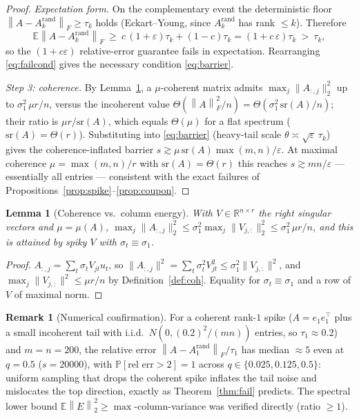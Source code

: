 \documentclass{amsart}
\newtheorem{lemma}{Lemma}
\theoremstyle{definition}
\newtheorem{remark}{Remark}
\newcommand{\R}{\mathbb{R}}
\newcommand{\Frob}[1]{\left\lVert #1\right\rVert_F}
\newcommand{\Op}[1]{\left\lVert #1\right\rVert_2}
\newcommand{\E}{\mathbb{E}}
\newcommand{\Prob}{\mathbb{P}}
\begin{document}
\begin{proof}
\emph{Expectation form.} On the complementary event the deterministic floor
$\Frob{A-A_k^{\mathrm{rand}}}\ge\tau_k$ holds (Eckart--Young, since
$A_k^{\mathrm{rand}}$ has rank $\le k$). Therefore
\[
\E\Frob{A-A_k^{\mathrm{rand}}}\ \ge\ c\,(1+\varepsilon)\tau_k+(1-c)\tau_k
=(1+c\,\varepsilon)\tau_k\ >\ \tau_k,
\]
so the $(1+c\varepsilon)$ relative-error guarantee fails in expectation.
Rearranging \eqref{eq:failcond} gives the necessary condition \eqref{eq:barrier}.

\emph{Step 3: coherence.} By Lemma~\ref{lem:colenergy}, a $\mu$-coherent matrix
admits $\max_j\|A_{:,j}\|_2^2$ up to $\sigma_1^2\,\mu r/n$, versus the incoherent
value $\Theta(\Frob A^2/n)=\Theta(\sigma_1^2\,\mathrm{sr}(A)/n)$; their ratio is
$\mu r/\mathrm{sr}(A)$, which equals $\Theta(\mu)$ for a flat spectrum
($\mathrm{sr}(A)=\Theta(r)$). Substituting into \eqref{eq:barrier} (heavy-tail
scale $\theta\asymp\sqrt\varepsilon\,\tau_k$) gives the coherence-inflated
barrier $s\gtrsim\mu\,\mathrm{sr}(A)\max(m,n)/\varepsilon$. At maximal coherence
$\mu=\max(m,n)/r$ with $\mathrm{sr}(A)=\Theta(r)$ this reaches
$s\gtrsim mn/\varepsilon$ --- essentially all entries --- consistent with the
exact failures of Propositions~\ref{prop:spike}--\ref{prop:coupon}.
\end{proof}

\begin{lemma}[Coherence vs.\ column energy]\label{lem:colenergy}
With $V\in\R^{n\times r}$ the right singular vectors and $\mu=\mu(A)$,
$\max_j\|A_{:,j}\|_2^2\le\sigma_1^2\max_j\|V_{j,:}\|_2^2\le\sigma_1^2\,\mu r/n$,
and this is attained by spiky $V$ with $\sigma_t\equiv\sigma_1$.
\end{lemma}

\begin{proof}
$A_{:,j}=\sum_t\sigma_t V_{jt}u_t$, so $\|A_{:,j}\|^2=\sum_t\sigma_t^2V_{jt}^2
\le\sigma_1^2\|V_{j,:}\|^2$, and $\max_j\|V_{j,:}\|^2\le\mu r/n$ by
Definition~\ref{def:coh}. Equality for $\sigma_t\equiv\sigma_1$ and a row of $V$
of maximal norm.
\end{proof}

\begin{remark}[Numerical confirmation]\label{rem:numfail}
For a coherent rank-$1$ spike ($A=e_1e_1^\top$ plus a small incoherent tail
with i.i.d.\ $N(0,(0.2)^2/(mn))$ entries, so $\tau_1\approx0.2$) and $m=n=200$,
the relative error
$\Frob{A-A_1^{\mathrm{rand}}}/\tau_1$ has median $\approx5$ even at $q=0.5$
($s=20000$), with $\Prob[\text{rel err}>2]=1$ across $q\in\{0.025,0.125,0.5\}$:
uniform sampling that drops the coherent spike inflates the tail noise and
mislocates the top direction, exactly as Theorem~\ref{thm:fail} predicts. The
spectral lower bound $\E\Op E^2\ge\max$-column-variance was verified directly
(ratio $\ge1$).
\end{remark}
\end{document}
